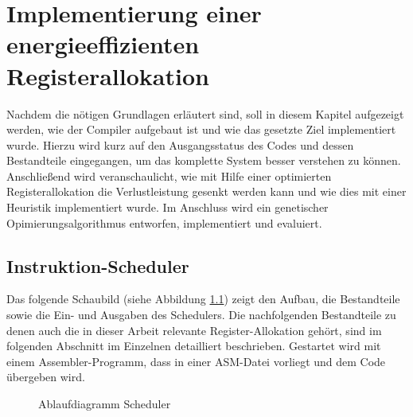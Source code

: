 \chapter{Implementierung einer energieeffizienten Registerallokation}
\label{chap:Implementierung}
Nachdem die nötigen Grundlagen erläutert sind, soll in diesem Kapitel aufgezeigt werden, wie der Compiler aufgebaut ist und wie das gesetzte Ziel implementiert wurde. Hierzu wird kurz auf den Ausgangsstatus des Codes und dessen Bestandteile eingegangen, um das komplette System besser verstehen zu können. Anschließend wird veranschaulicht, wie mit Hilfe einer optimierten Registerallokation die Verlustleistung gesenkt werden kann und wie dies mit einer Heuristik implementiert wurde. Im Anschluss wird ein genetischer Opimierungsalgorithmus entworfen, implementiert und evaluiert.
\newpage
\section{Instruktion-Scheduler}
 Das folgende Schaubild (siehe Abbildung \ref{fig:flow_compiler}) zeigt den Aufbau, die Bestandteile sowie die Ein- und Ausgaben des Schedulers. Die nachfolgenden Bestandteile zu denen auch die in dieser Arbeit relevante Register-Allokation gehört, sind im folgenden Abschnitt im Einzelnen detailliert beschrieben.
 Gestartet wird mit einem Assembler-Programm, dass in einer ASM-Datei vorliegt und dem Code übergeben wird.
 
 
%			


	\begin{figure}[H] 
		\centering
		
		\caption{Ablaufdiagramm Scheduler}
		\label{fig:flow_compiler}
	\end{figure}

